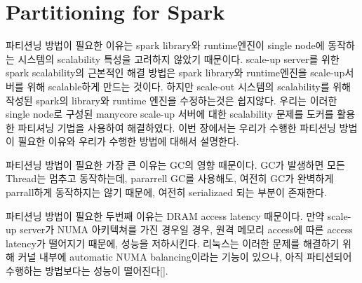 \section{Partitioning for Spark}
\ifkor
파티션닝 방법이 필요한 이유는 spark library와 runtime엔진이 single node에 동작하는 
시스템의 scalability 특성을 고려하지 않았기 때문이다. 
scale-up server를 위한 spark scalability의 근본적인 해결 방법은 spark library와 
runtime엔진을 scale-up서버를 위해 scalable하게 만드는 것이다.
하지만 scale-out 시스템의 scalability를 위해 작성된 spark의 library와 runtime 엔진을 
수정하는것은 쉽지않다.
우리는 이러한 single node로 구성된 manycore scale-up 서버에 대한 scalability
문제를 도커를 활용한 파티셔닝 기법을 사용하여 해결하였다.
이번 장에서는 우리가 수행한 파티션닝 방법이 필요한 이유와 우리가 수행한 방법에 대해서 설명한다.
\else

\fi


\ifkor
파티션닝 방법이 필요한 가장 큰 이유는 GC의 영향 때문이다. 
GC가 발생하면 모든 Thread는 멈추고 동작하는데, pararrell GC를 사용해도, 여전히 
GC가 완벽하게 parrall하게 동작하지는 않기 때문에, 여전히 serializaed 되는 부분이 존재한다.
\else

\fi

\ifkor
파티션닝 방법이 필요한 두번째 이유는 DRAM access latency 때문이다. 
만약 scale-up server가 NUMA 아키텍쳐를 가진 경우일 경우, 
원격 메모리 access에 따른 access latency가 떨어지기 때문에, 성능을 저하시킨다.
리눅스는 이러한 문제를 해결하기 위해 커널 내부에 automatic NUMA balancing이라는 기능이 있으나, 
아직 파티션되어 수행하는 방법보다는 성능이 떨어진다[]. 
\else

\fi


